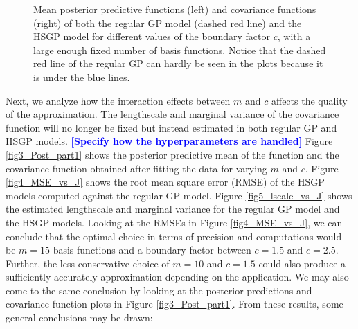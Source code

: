 \documentclass[onecolumn,a4paper,11pt]{article}
\newcommand{\todo}[1]{\textcolor{blue}{\textbf{[#1]}}}
\begin{document}
\begin{figure}
\caption{Mean posterior predictive functions (left) and covariance functions (right) of both the regular GP model (dashed red line) and the HSGP model for different values of the boundary factor $c$, with a large enough fixed number of basis functions. Notice that the dashed red line of the regular GP can hardly be seen in the plots because it is under the blue lines.}
  \label{fig2_Post_L}
\end{figure}


Next, we analyze how the interaction effects between $m$ and $c$ affects the quality of the approximation. The lengthscale and marginal variance of the covariance function will no longer be fixed but instead estimated in both regular GP and HSGP models. \todo{Specify how the hyperparameters are handled} Figure \ref{fig3_Post_part1} shows the posterior predictive mean of the function and the covariance function obtained after fitting the data for varying $m$ and $c$. Figure \ref{fig4_MSE_vs_J} shows the root mean square error (RMSE) of the HSGP models computed against the regular GP model. Figure \ref{fig5_lscale_vs_J} shows the estimated lengthscale and marginal variance for the regular GP model and the HSGP models. Looking at the RMSEs in Figure \ref{fig4_MSE_vs_J}, we can conclude that the optimal choice in terms of precision and computations would be $m = 15$ basis functions and a boundary factor between $c = 1.5$ and $c = 2.5$. Further, the less conservative choice of $m = 10$ and $c = 1.5$  could also produce a sufficiently accurately approximation depending on the application. We may also come to the same conclusion by looking at the posterior predictions and covariance function plots in Figure \ref{fig3_Post_part1}. From these results, some general conclusions may be drawn:
\end{document}
